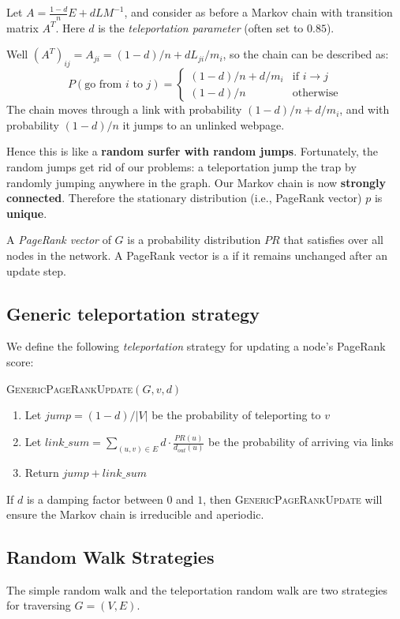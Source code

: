 \documentclass[11pt]{exam}
\begin{document}
Let $A = \frac{1-d}{n} E + d L M^{-1}$, and consider as before a Markov chain with transition matrix $A^T$. Here $d$ is the \emph{teleportation parameter} (often set to $0.85$).

Well $(A^T)_{ij} = A_{ji} = (1-d)/n + d L_{ji}/m_i$, so the chain can be described as:
\[
P(\text{go from } i \text{ to } j) = \begin{cases} 
(1-d)/n + d/m_i & \text{if } i \to j \\
(1-d)/n & \text{otherwise}
\end{cases}
\]
The chain moves through a link with probability $(1-d)/n + d/m_i$, and with probability $(1-d)/n$ it jumps to an unlinked webpage.

Hence this is like a \textbf{random surfer with random jumps}. Fortunately, the random jumps get rid of our problems: a teleportation jump  the trap by randomly jumping anywhere in the graph. Our Markov chain is now \textbf{strongly connected}. Therefore the stationary distribution (i.e., PageRank vector) $p$ is \textbf{unique}.

A \emph{PageRank vector} of $G$ is a probability distribution $PR$ that satisfies
\vs{2cm}
over all nodes in the network. A PageRank vector is a  if it remains unchanged after an update step. 

\newpage
\subsection{Generic teleportation strategy}
We define the following \emph{teleportation} strategy for updating a node's PageRank score:

\textsc{GenericPageRankUpdate}$(G,v,d)$
\begin{enumerate}
    \item Let $jump = (1-d) / |V|$ be the probability of teleporting to $v$
    \item Let $link\_sum = \sum_{(u,v) \in E} d \cdot \frac{PR(u)}{d_{out}(u)}$ be the probability of arriving via links
    \item Return $jump + link\_sum$
\end{enumerate}
\begin{lemma}
    If $d$ is a damping factor between $0$ and $1$, then \textsc{GenericPageRankUpdate} will ensure the Markov chain is irreducible and aperiodic.
\end{lemma}

\newpage
\subsection{Random Walk Strategies}
The simple random walk and the teleportation random walk are two strategies for traversing $G = (V,E)$.\\
\end{document}
